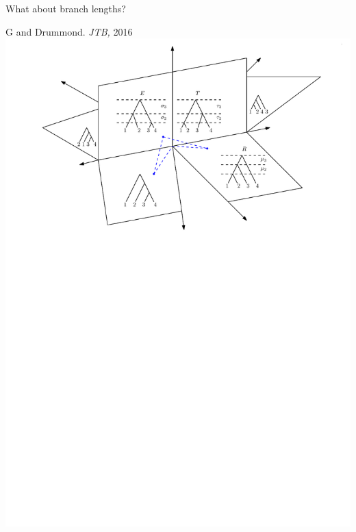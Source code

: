 \documentclass{beamer}
\begin{document}
\begin{frame}{What about branch lengths?}
\begin{block}{G and Drummond. \emph{JTB,} 2016}
\includegraphics[width=\framewidth]{tauSpace}
\end{block}
\end{frame}
\end{document}
